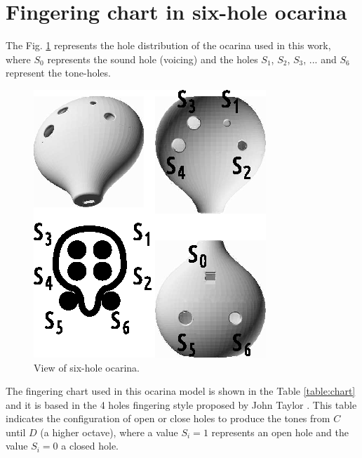 \documentclass[11pt,twocolumn]{article}
\begin{document}
\section{Fingering chart in six-hole ocarina}
The Fig. \ref{fig:ocarinaview} represents the hole distribution of the ocarina
used in this work, where $S_0$ represents the sound hole (voicing)
and the holes $S_1$, $S_2$, $S_3$, ... and $S_6$ represent the tone-holes.
\begin{figure}[ht!]
\centering
\includegraphics[width=0.750\columnwidth]{ocarina-view.eps}
\caption{View of six-hole ocarina. }
\label{fig:ocarinaview}
\end{figure}
The fingering chart used in this ocarina model is shown in the Table \ref{table:chart} and it is based in the 
4 holes fingering style proposed by John Taylor \cite[pp. 79, 146]{metropolitan1985american} \cite[pp. 30]{1999air}. 
This table indicates the configuration of open or close holes
to produce the tones from $C$ until $D$ (a higher octave), where a value $S_i=1$ represents an 
open hole and the value $S_i=0$ a closed hole.
\end{document}
